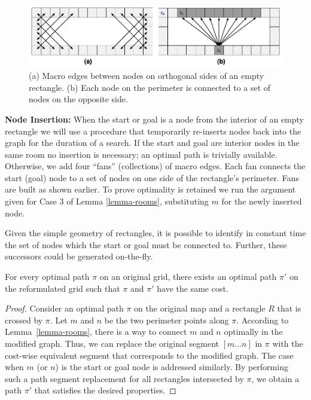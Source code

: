\begin{figure}[tb]
       \begin{center}
		   \includegraphics[width=0.97\columnwidth, trim = 10mm 10mm 10mm 0mm]
			{diagrams/macroedges_wide.png}
       \end{center}
	\vspace{-3pt}
       \caption{(a) Macro edges between nodes on orthogonal sides of an empty
       rectangle. (b) Each node on the perimeter is connected to a set of 
		nodes on the opposite side.}
       \label{fig-macroedges}
\end{figure}

\noindent
\textbf{Node Insertion:}
When the start or goal is a node from the interior of an empty rectangle we
will use a procedure that temporarily re-inserts nodes back into the 
graph for the duration of a search.
{If the start and goal are interior nodes
in the same room no insertion is necessary; an optimal path is trivially
available. } {Otherwise, we add four ``fans'' (collections) of macro edges.  Each fan connects
the start (goal) node to a set of nodes on one side of the rectangle's
perimeter.  Fans are built as shown earlier.}
To prove optimality is retained we run the argument given
for Case 3 of Lemma \ref{lemma-rooms}, substituting $m$ for the newly inserted node.
\par
Given the simple geometry of rectangles, it is possible to identify in constant
time the set of nodes which the start or goal must be connected to.  Further,
these successors could be generated on-the-fly.

\begin{theorem}
For every optimal path $\pi$ on an original grid, there exists an optimal path
$\pi'$ on the reformulated grid such that $\pi$ and $\pi'$ have the
same cost.
\end{theorem}
\begin{proof}
Consider an optimal path $\pi$ on the original map and a rectangle $R$ that is
crossed by $\pi$.  Let $m$ and $n$ be the two perimeter points along $\pi$.
According to Lemma~\ref{lemma-rooms}, there is a way to connect $m$ and $n$
optimally in the modified graph. Thus, we can replace the original segment $[m
\dots n]$ in $\pi$ with the cost-wise equivalent segment that corresponds to the
modified graph.  The case when $m$ (or $n$) is the start or goal node is
addressed similarly.  By performing such a
path segment replacement for all rectangles intersected by $\pi$, we obtain a
path $\pi'$ that satisfies the desired properties.
\end{proof}

